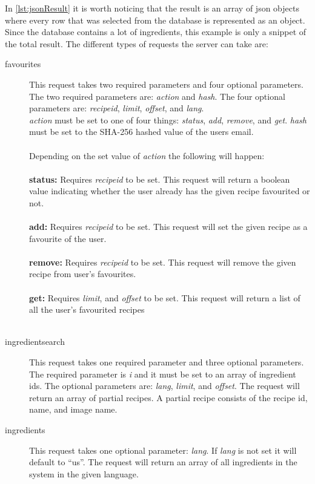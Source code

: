 In \autoref{lst:jsonResult} it is worth noticing that the result is an array of \ac{json} objects where every row that was selected from the database is represented as an object. Since the database contains a lot of ingredients, this example is only a snippet of the total result. The different types of requests the server can take are:

\begin{description}
\item[favourites] This request takes two required parameters and four optional parameters. The two required parameters are: \textit{action} and \textit{hash}. The four optional parameters are: \textit{recipeid}, \textit{limit}, \textit{offset}, and \textit{lang}.\\
  \textit{action} must be set to one of four things: \textit{status}, \textit{add}, \textit{remove}, and \textit{get}. \textit{hash} must be set to the SHA-256 hashed value of the users email.\\\\
  Depending on the set value of \textit{action} the following will happen:\\\\
  \textbf{status:} Requires \textit{recipeid} to be set. This request will return a boolean value indicating whether the user already has the given recipe favourited or not.\\\\
  \textbf{add:} Requires \textit{recipeid} to be set. This request will set the given recipe as a favourite of the user.\\\\
  \textbf{remove:} Requires \textit{recipeid} to be set. This request will remove the given recipe from user's favourites.\\\\
  \textbf{get:} Requires \textit{limit}, and \textit{offset} to be set. This request will return a list of all the user's favourited recipes\\\\
\item[ingredientsearch] This request takes one required parameter and three optional parameters. The required parameter is \textit{i} and it must be set to an array of ingredient ids. The optional parameters are: \textit{lang}, \textit{limit}, and \textit{offset}. The request will return an array of partial recipes. A partial recipe consists of the recipe id, name, and image name.
\item[ingredients] This request takes one optional parameter: \textit{lang}. If \textit{lang} is not set it will default to ``us''. The request will return an array of all ingredients in the system in the given language.

\end{description}
